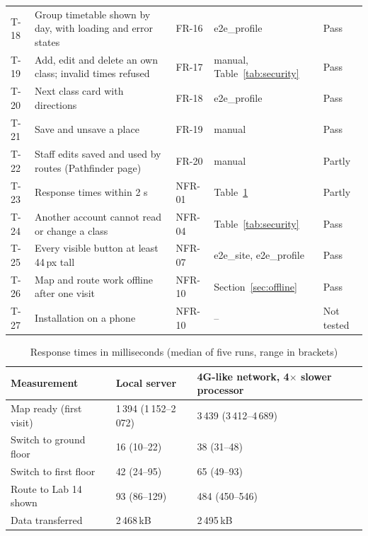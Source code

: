 \documentclass[12pt,a4paper]{report}
\newcommand{\tablespacing}{\singlespacing\small}
\begin{document}
{\begin{longtable}{p{0.9cm}>{\raggedright}p{6.3cm}>{\raggedright}p{1.4cm}>{\raggedright}p{3.4cm}>{\raggedright\arraybackslash}p{1.3cm}}
T-18 & Group timetable shown by day, with loading and error states & FR-16 & e2e\_profile & Pass \\
T-19 & Add, edit and delete an own class; invalid times refused & FR-17 & manual, Table~\ref{tab:security} & Pass \\
T-20 & Next class card with directions & FR-18 & e2e\_profile & Pass \\
T-21 & Save and unsave a place & FR-19 & manual & Pass \\
T-22 & Staff edits saved and used by routes (Pathfinder page) & FR-20 & manual & Partly \\
T-23 & Response times within 2 s & NFR-01 & Table~\ref{tab:timings} & Partly \\
T-24 & Another account cannot read or change a class & NFR-04 & Table~\ref{tab:security} & Pass \\
T-25 & Every visible button at least 44\,px tall & NFR-07 & e2e\_site, e2e\_profile & Pass \\
T-26 & Map and route work offline after one visit & NFR-10 & Section~\ref{sec:offline} & Pass \\
T-27 & Installation on a phone & NFR-10 & -- & Not tested \\
\end{longtable}}

\begin{table}[htbp]
\centering\tablespacing
\caption{Response times in milliseconds (median of five runs, range in brackets)}\label{tab:timings}
\begin{tabular}{p{4.2cm}p{4.6cm}p{4.6cm}}
\toprule
Measurement & Local server & 4G-like network, 4$\times$ slower processor \\
\midrule
Map ready (first visit) & 1\,394 (1\,152--2\,072) & 3\,439 (3\,412--4\,689) \\
Switch to ground floor & 16 (10--22) & 38 (31--48) \\
Switch to first floor & 42 (24--95) & 65 (49--93) \\
Route to Lab 14 shown & 93 (86--129) & 484 (450--546) \\
Data transferred & 2\,468\,kB & 2\,495\,kB \\
\bottomrule
\end{tabular}
\end{table}
\end{document}
